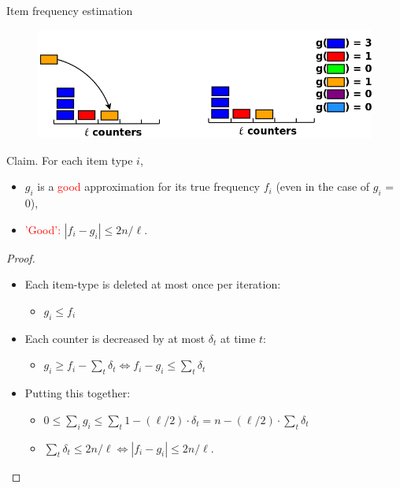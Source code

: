 \documentclass[first=dgreen,second=purple,logo=redque]{aaltoslides}
\begin{document}
\begin{frame}[allowframebreaks=1]{Item frequency estimation}
\framebreak

\begin{figure}
  \includegraphics[scale=0.3]{plots/fi6}
 \label{fig:fi5}
\end{figure}

\textcolor{dgreen}{Claim.} 
For each item type $i$,
\begin{itemize}
	\item $g_{i}$ is a \textcolor{red}{good} approximation for its
  true frequency $f_{i}$ (even in the case of $g_{i}$ = 0),
	\item \textcolor{red}{'Good':} $|f_{i} - g_{i} | \leq 2n/\ell$.
\end{itemize}         

\framebreak

\begin{proof}
\begin{itemize}
	\item Each item-type is deleted \textcolor{dgreen}{at most} once per iteration:
		\begin{itemize}\item $g_{i} \leq f_{i}$\end{itemize}
	\item Each counter is decreased by at most $\delta_{t}$ at time $t$:
		\begin{itemize}\item $g_{i} \geq f_{i} - \sum_{t} \delta_{t} \Leftrightarrow f_{i} - g_{i} \leq \sum_{t} \delta_{t}$\end{itemize}
	\item Putting this together:
		\begin{itemize}
			\item $0 \leq \sum_{i}g_{i} \leq \sum_{t} 1 - (\ell/2)
				\cdot \delta_{t} = n - (\ell/2) \cdot \sum_{t} \delta_{t}$
			\item $\sum_{t} \delta_{t} \leq 2n/\ell \Leftrightarrow |f_{i} - g_{i}| \leq 2n/\ell$.
		\end{itemize}
\end{itemize}
\end{proof}


\end{frame}
\end{document}
